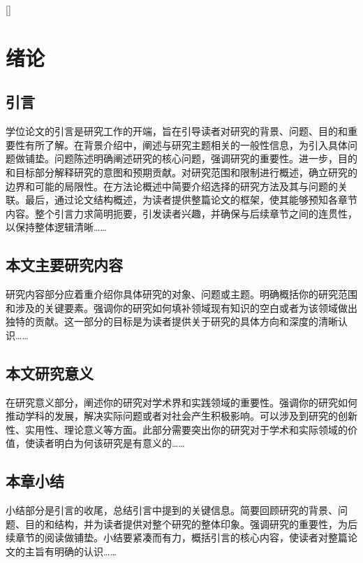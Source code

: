 \cleardoublepage




[]
\section{绪论}
\subsection{引言}
学位论文的引言是研究工作的开端，旨在引导读者对研究的背景、问题、目的和重要性有所了解。在背景介绍中，阐述与研究主题相关的一般性信息，为引入具体问题做铺垫。问题陈述明确阐述研究的核心问题，强调研究的重要性。进一步，目的和目标部分解释研究的意图和预期贡献。对研究范围和限制进行概述，确立研究的边界和可能的局限性。在方法论概述中简要介绍选择的研究方法及其与问题的关联。最后，通过论文结构概述，为读者提供整篇论文的框架，使其能够预知各章节内容。整个引言力求简明扼要，引发读者兴趣，并确保与后续章节之间的连贯性，以保持整体逻辑清晰……

\subsection{本文主要研究内容}
研究内容部分应着重介绍你具体研究的对象、问题或主题。明确概括你的研究范围和涉及的关键要素。强调你的研究如何填补领域现有知识的空白或者为该领域做出独特的贡献。这一部分的目标是为读者提供关于研究的具体方向和深度的清晰认识……

\subsection{本文研究意义}
在研究意义部分，阐述你的研究对学术界和实践领域的重要性。强调你的研究如何推动学科的发展，解决实际问题或者对社会产生积极影响。可以涉及到研究的创新性、实用性、理论意义等方面。此部分需要突出你的研究对于学术和实际领域的价值，使读者明白为何该研究是有意义的……

\subsection{本章小结}
小结部分是引言的收尾，总结引言中提到的关键信息。简要回顾研究的背景、问题、目的和结构，并为读者提供对整个研究的整体印象。强调研究的重要性，为后续章节的阅读做铺垫。小结要紧凑而有力，概括引言的核心内容，使读者对整篇论文的主旨有明确的认识……


